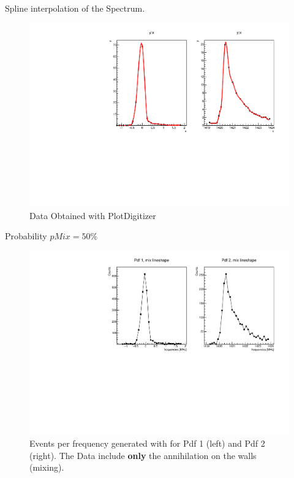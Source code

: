 \documentclass[9pt]{beamer}
\begin{document}
\begin{frame}{Spline interpolation of the Spectrum.}
\begin{figure}[hbtp]
\centering
\includegraphics[width = \textwidth]{SplineInterpolation.pdf}
\caption{Data Obtained with PlotDigitizer}
\end{figure}
\end{frame}

\begin{frame}{Probability $pMix = 50 \% $}
\begin{figure}[hbtp]
\centering
\includegraphics[width = \textwidth]{NmixOnly.pdf}
\caption{Events per frequency generated with for Pdf 1 (left) and Pdf 2 (right). \newline The Data include \textbf{only} the annihilation on the walls (mixing).}
\end{figure}
\end{frame}
\end{document}
